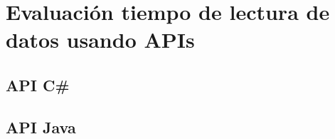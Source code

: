 \section{Evaluación tiempo de lectura de datos usando APIs}

\subsection{API C\#}

\subsection{API Java}